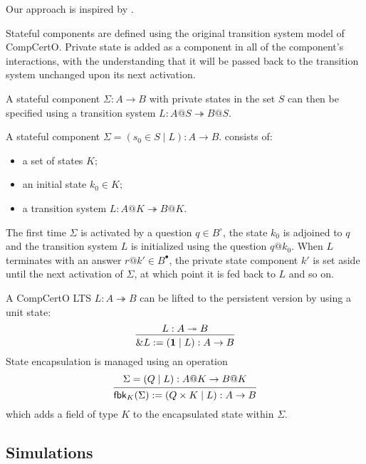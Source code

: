\documentclass[acmsmall,screen,review,anonymous]{acmart}
\newcommand{\que}{\circ}
\newcommand{\ans}{\bullet}
\begin{document}
Our approach is inspired by \citet{feedback,caots}.

Stateful components are defined using
the original transition system model of CompCertO.
Private state is added as a component
in all of the component's interactions,
with the understanding that
it will be passed back to the transition system
unchanged upon its next activation.

A stateful component $\Sigma : A \rightarrow B$
with private states in the set $S$
can then be specified using a transition system
$L : A@S \twoheadrightarrow B@S$.

\begin{definition}
A stateful component
$\Sigma = (s_0 \in S \mid L) : A \rightarrow B$.
consists of:
\begin{itemize}
  \item a set of states $K$;
  \item an initial state $k_0 \in K$;
  \item a transition system $L : A@K \twoheadrightarrow B@K$.
\end{itemize}
\end{definition}

The first time $\Sigma$ is activated by a question $q \in B^\que$,
the state $k_0$ is adjoined to $q$
and the transition system $L$ is initialized using the question $q@k_0$.
When $L$ terminates with an answer $r@k' \in B^\ans$,
the private state component $k'$
is set aside until
the next activation of $\Sigma$,
at which point it is fed back to $L$ and so on.

A CompCertO LTS $L : A \twoheadrightarrow B$
can be lifted to the persistent version
by using a unit state:
\[
  \begin{prooftree}
    \hypo{L : A \twoheadrightarrow B}
    \infer1{\&L := (\mathbf{1} \mid L) : A \rightarrow B}
  \end{prooftree}
\]
State encapsulation is managed using an operation
\[
  \begin{prooftree}
    \hypo{\Sigma = (Q \mid L) : A@K \rightarrow B@K}
    \infer1{\mathsf{fbk}_K(\Sigma) := (Q \times K \mid L) : A \rightarrow B}
  \end{prooftree}
\]
which adds a field of type $K$ to the encapsulated state within $\Sigma$.


\subsection{Simulations} %
\end{document}
